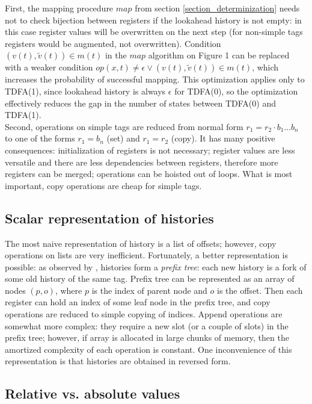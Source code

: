\documentclass{article}
\newcommand{\Xin}{\!\in\!}
\newcommand{\Xeq}{\!=\!}
\theoremstyle{definition}
\begin{document}
\begin{multicols}{2}
First, the mapping procedure $map$ from section \ref{section_determinization}
needs not to check bijection between registers if the lookahead history is not empty:
in this case register values will be overwritten on the next step
(for non-simple tags registers would be augmented, not overwritten).
Condition $(v(t), \widetilde{v}(t)) \Xin m(t)$ in the $map$ algorithm on Figure 1
can be replaced with a weaker condition $op(x, t) \!\neq\! \epsilon \vee (v(t), \widetilde{v}(t)) \Xin m(t)$,
which increases the probability of successful mapping.
This optimization applies only to TDFA(1), since lookahead history is always $\epsilon$ for TDFA(0),
so the optimization effectively reduces the gap in the number of states between TDFA(0) and TDFA(1).
\\

Second, operations on simple tags are reduced from normal form $r_1 \Xeq r_2 \cdot b_1 \dots b_n$
to one of the forms $r_1 \Xeq b_n$ (set) and $r_1 \Xeq r_2$ (copy).
It has many positive consequences:
initialization of registers is not necessary;
register values are less versatile and there are less dependencies between registers, therefore more registers can be merged;
operations can be hoisted out of loops.
What is most important, copy operations are cheap for simple tags.

\subsection*{Scalar representation of histories}

The most naive representation of history is a list of offsets;
however, copy operations on lists are very inefficient.
Fortunately, a better representation is possible: as observed by \cite{Kar14}, histories form a \emph{prefix tree}:
each new history is a fork of some old history of the same tag.
Prefix tree can be represented as an array of nodes $(p, o)$,
where $p$ is the index of parent node and $o$ is the offset.
Then each register can hold an index of some leaf node in the prefix tree,
and copy operations are reduced to simple copying of indices.
Append operations are somewhat more complex: they require a new slot (or a couple of slots) in the prefix tree;
however, if array is allocated in large chunks of memory,
then the amortized complexity of each operation is constant.
One inconvenience of this representation is that histories are obtained in reversed form.

\subsection*{Relative vs. absolute values}


\end{multicols}
\end{document}
